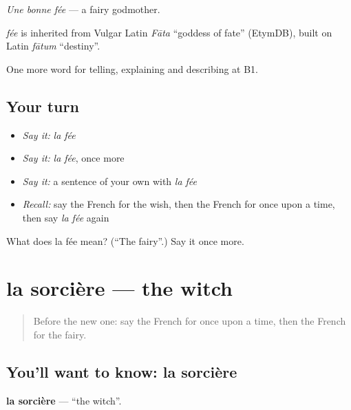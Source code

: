 \emph{Une bonne fée} — a fairy godmother.

\begin{cousinweb}
\emph{fée} is inherited from Vulgar Latin \emph{Fāta} \textquotedblleft{}goddess of fate\textquotedblright{} (EtymDB), built on Latin \emph{fātum} \textquotedblleft{}destiny\textquotedblright{}.
\end{cousinweb}

\begin{grammarlens}[title={What you've built}]
One more word for telling, explaining and describing at B1.
\end{grammarlens}

\subsection*{Your turn}
\begin{itemize}
\raggedright
  \item \emph{Say it:} \emph{la fée}
  \item \emph{Say it:} \emph{la fée}, once more
  \item \emph{Say it:} a sentence of your own with \emph{la fée}
  \item \emph{Recall:} say the French for the wish, then the French for once upon a time, then say \emph{la fée} again
\end{itemize}

\begin{tcolorbox}[breakable,colback=teal!4,colframe=teal!35!black,title={Before you move on}]
What does la fée mean? (\textquotedblleft{}The fairy\textquotedblright{}.) Say it once more.
\end{tcolorbox}
\section[la sorcière]{la sorcière — the witch}

\label{lesson:FR-C321-sorciere}



\begin{quote}
Before the new one: say the French for once upon a time, then the French for the fairy.
\end{quote}

\subsection*{You'll want to know: la sorcière}
\textbf{la sorcière} — \textquotedblleft{}the witch\textquotedblright{}.

